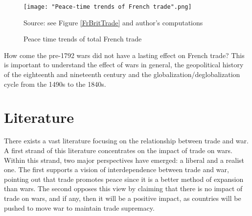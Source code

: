 \documentclass[12pt,a4paper,titlepage,english]{article}
\newcommand{\source}[1]{\caption*{\footnotesize Source: {#1}} }
\begin{document}
\begin{figure}
\caption{Peace time trends of total French trade}
\centering
\texttt{[image: "Peace-time trends of French trade".png]}

\source{see Figure \ref{FrBritTrade} and author's computations}
\label{FrPeaceTrade}
\end{figure}

How come the pre-1792 wars did not have a lasting effect on French trade? This is important to understand the effect of wars in general, the geopolitical history of the eighteenth and nineteenth century and the globalization/deglobalization cycle from the 1490s to the 1840s.

\section{Literature}
There exists a vast literature focusing on the relationship between trade and war.
A first strand of this literature concentrates on the impact of trade on wars. Within this strand, two major perspectives have emerged: a liberal and a realist one. The first supports a vision of interdependence between trade and war, pointing out that trade promotes peace since it is a better method of expansion than wars. The second opposes this view by claiming that there is no impact of trade on wars, and if any, then it will be a positive impact, as countries will be pushed to move war to maintain trade supremacy.
\end{document}
